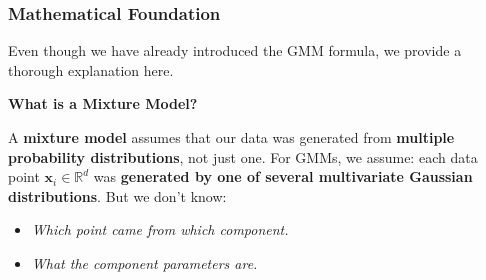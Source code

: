 \subsubsection{Mathematical Foundation}\label{subsubsection: Mathematical Foundation}

Even though we have already introduced the GMM formula, we provide a thorough explanation here.

\highspace
\begin{flushleft}
    \textcolor{Green3}{ \textbf{What is a Mixture Model?}}
\end{flushleft}
A \textbf{mixture model} assumes that our data was generated from \textbf{multiple probability distributions}, not just one. For GMMs, we assume: each data point $\mathbf{x}_i \in \mathbb{R}^d$ was \textbf{generated by one of several multivariate Gaussian distributions}. But we don't know:
\begin{itemize}
    \item \emph{Which point came from which component.}
    \item \emph{What the component parameters are.}
\end{itemize}

